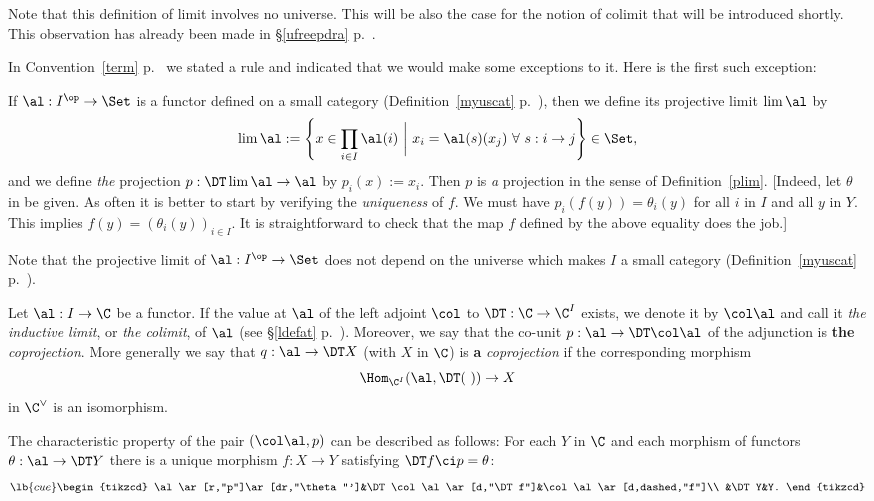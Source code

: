 \documentclass[12pt]{article}
\theoremstyle{remark}
\theoremstyle{definition}
\begin{document}
\begin{rk}
Note that this definition of limit involves no universe. This will be also the case for the notion of colimit that will be introduced shortly. This observation has already been made in \S\ref{ufreepdra} p.~.
\end{rk}

%

In Convention~\ref{term} p.~ we stated a rule and indicated that we would make some exceptions to it. Here is the first such exception:

\begin{conv} 
If $\al:I^{\op}\to\Set$ is a functor defined on a small category (Definition~\ref{myuscat} p.~), then we define its projective limit $\lim\al$ by 
$$ 
\lim\al:=\left\{x\in\prod_{i\in I}\al(i)\ \bigg|\ x_i=\al(s)(x_j)\ \forall\ s:i\to j\right\}\in\Set,
$$ 
and we define \emph{the} projection $p:\DT\lim\al\to\al$ by $p_i(x):=x_i$. Then $p$ is \emph{a} projection in the sense of Definition~\ref{plim}. [Indeed, let $\theta$ in  be given. As often it is better to start by verifying the \emph{uniqueness} of $f$. We must have $p_i(f(y))=\theta_i(y)$ for all $i$ in $I$ and all $y$ in $Y$. This implies $f(y)=(\theta_i(y))_{i\in I}$. It is straightforward to check that the map $f$ defined by the above equality does the job.]
\end{conv}

Note that the projective limit of $\al:I^{\op}\to\Set$ does not depend on the universe which makes $I$ a small category (Definition~\ref{myuscat} p.~).

\begin{df} 
Let $\al:I\to\C$ be a functor. If the value at $\al$ of the left adjoint $\col$ to $\DT:\C\to\C^I$ exists, we denote it by $\col\al$ and call it {\em the inductive limit}, or {\em the colimit}, of $\al$ (see \S\ref{ldefat} p.~). Moreover, we say that the co-unit $p:\al\to\DT\col\al$ of the adjunction is \textbf{the} \emph{coprojection}. More generally we say that $q:\al\to\DT X$ (with $X$ in $\C$) is \textbf{a} \emph{coprojection} if the corresponding morphism 
$$
\Hom_{\C^I}(\al,\DT(\ ))\to X
$$ 
in $\C^\vee$ is an isomorphism.
\end{df}

The characteristic property of the pair $(\col\al,p)$ can be described as follows: For each $Y$ in $\C$ and each morphism of functors $\theta:\al\to\DT Y$ there is a unique morphism $f:X\to Y$ satisfying $\DT f\ci p=\theta$: 
\begin{equation}\lb{cue}
\begin{tikzcd}
\al\ar[r,"p"]\ar[dr,"\theta"']&\DT\col\al\ar[d,"\DT f"]&\col\al\ar[d,dashed,"f"]\\ 
&\DT Y&Y.
\end{tikzcd}
\end{equation}
\end{document}
